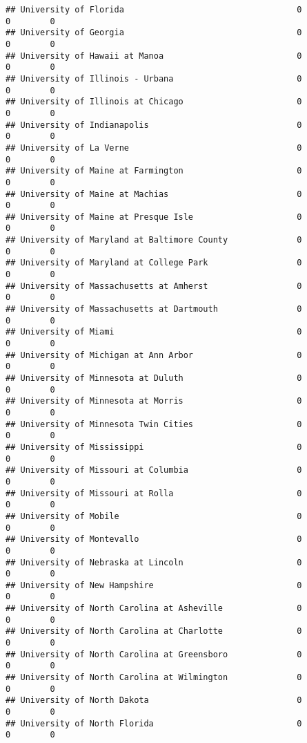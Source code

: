 \documentclass[
]{article}
\begin{document}
\begin{verbatim}
## University of Florida                                   0           0        0
## University of Georgia                                   0           0        0
## University of Hawaii at Manoa                           0           0        0
## University of Illinois - Urbana                         0           0        0
## University of Illinois at Chicago                       0           0        0
## University of Indianapolis                              0           0        0
## University of La Verne                                  0           0        0
## University of Maine at Farmington                       0           0        0
## University of Maine at Machias                          0           0        0
## University of Maine at Presque Isle                     0           0        0
## University of Maryland at Baltimore County              0           0        0
## University of Maryland at College Park                  0           0        0
## University of Massachusetts at Amherst                  0           0        0
## University of Massachusetts at Dartmouth                0           0        0
## University of Miami                                     0           0        0
## University of Michigan at Ann Arbor                     0           0        0
## University of Minnesota at Duluth                       0           0        0
## University of Minnesota at Morris                       0           0        0
## University of Minnesota Twin Cities                     0           0        0
## University of Mississippi                               0           0        0
## University of Missouri at Columbia                      0           0        0
## University of Missouri at Rolla                         0           0        0
## University of Mobile                                    0           0        0
## University of Montevallo                                0           0        0
## University of Nebraska at Lincoln                       0           0        0
## University of New Hampshire                             0           0        0
## University of North Carolina at Asheville               0           0        0
## University of North Carolina at Charlotte               0           0        0
## University of North Carolina at Greensboro              0           0        0
## University of North Carolina at Wilmington              0           0        0
## University of North Dakota                              0           0        0
## University of North Florida                             0           0        0

\end{verbatim}
\end{document}
